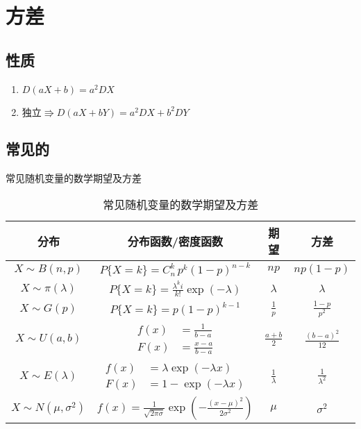 \section{方差}
\label{sec:方差}

\subsection{性质}
\label{sub:性质}

\begin{enumerate}
    \item $D(aX+b) = a^2DX$
    \item $\text{独立} \Rrightarrow D(aX+bY) = a^2DX + b^2DY$
\end{enumerate}

\subsection{常见的}
\label{sub:常见的}
常见随机变量的数学期望及方差

\begin{table}[htpb]
    \centering
    \caption{常见随机变量的数学期望及方差}
    \label{tab:label}
    \begin{tabular}{|c|c|c|c|}
        \hline
        分布                  & 分布函数/密度函数                                         & 期望                               & 方差              \\
        \hline
        $X \sim B(n,p)$       & $P\{X         = k\} = C_n^k \, p^k (1-p)^{n-k}$           & $np$                               & $np(1-p)$         \\
        \hline
        $X \sim \pi(\lambda)$ & $P\{X         = k\}=\frac{\lambda^ki}{k!}\exp(-\lambda)$  & $\lambda$                          & $\lambda$         \\
        \hline
        $X \sim G(p)$         & $P\{X                 = k\}=p(1-p)^{k-1}$                 & $\frac{1}{p}$                      & $\frac{1-p}{p^2}$ \\
        \hline
        $X \sim U(a,b)$ & $\begin{aligned}
            f(x) &=\frac{1}{b-a} \\
            F(x) &=\frac{x-a}{b-a}
        \end{aligned}$ & $\frac{a+b}{2}$ & $\frac{(b-a)^2}{12}$ \\
        \hline
        $X \sim E(\lambda)$   & $\begin{aligned}
            f(x) &= \lambda \exp(-\lambda x)\\
            F(x)&= 1-\exp(-\lambda x)
        \end{aligned}$ & $\frac{1}{\lambda}$ & $\frac{1}{\lambda^2}$ \\
        \hline
        $X \sim N(\mu,\sigma^2)$ & $f(x)=\frac{1}{\sqrt{2\pi\sigma}}\exp(-\frac{(x-\mu)^2}{2\sigma^2})$ & $\mu$ & $\sigma^2$ \\
        \hline
    \end{tabular}
\end{table}



